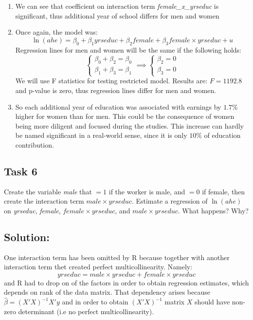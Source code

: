 \documentclass[10pt,a4paper]{amsart}
\begin{document}
\begin{enumerate}
      \item We can see that coefficient on interaction term \textit{female\_x\_yrseduc} is significant, thus
            additional year of school differs for men and women

      \item Once again, the model was:
            \[\ln(ahe) = \beta_0 + \beta_1 yrseduc + \beta_2 female + \beta_3 female \times yrseduc + u\]
            Regression lines for men and women will be the same if the following holds:
            \[\begin{cases}
                        \beta_0 + \beta_ 2 = \beta_0 \\
                        \beta_1 + \beta_3 = \beta_1
                  \end{cases} \implies
                  \begin{cases}
                        \beta_ 2 = 0 \\
                        \beta_3 = 0
                  \end{cases} \]
            We will use F statistics for testing restricted model. Results are: $ F= 1192.8$ and p-value is
            zero, thus regression lines differ for men and women.
      \item So each additional year of
            education was associated with earnings by $ 1.7\% $ higher for women than for men. This could
            be the consequence of women being more diligent and focused during the studies. This increase
            can hardly be named significant in a real-world sense, since it is only $ 10\% $ of education
            contribution.
\end{enumerate}
\subsection*{Task 6}
Create the variable \textit{male} that $ =1 $ if the worker is male, and $ =0 $ if female, then create
the interaction term $ male \times yrseduc $. Estimate a regression of $ \ln(ahe) $ on \textit{yrseduc},
\textit{female}, $ female \times yrseduc $, and $ male \times yrseduc $. What happens? Why?
\subsection*{Solution:}
One interaction term has been omitted by R because together with another interaction term thet created
perfect multicollinearity. Namely:
\[
      yrseduc = male \times yrseduc + female \times yrseduc
\]
and R had to drop on of the factors in order to obtain regression estimates, which depends on rank of
the data matrix. That dependency arises because $ \hat{\beta} = (X'X)^{-1}X'y $ and in order to obtain
$ (X'X)^{-1} $ matrix $ X $ should have non-zero determinant (i.e no perfect multicollinearity).
\end{document}
